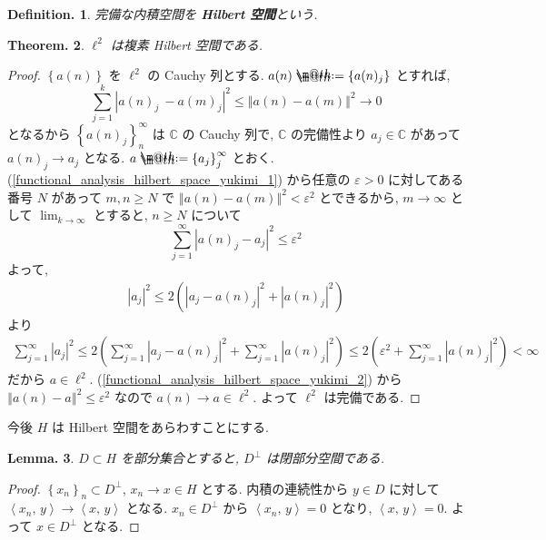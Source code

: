 \documentclass[openany, a4paper, oneside]{jsbook}
\makeatletter
\newcommand*{\defeq}{\mathrel{\rlap{%
\raisebox{0.3ex}{$\m@th\cdot$}}%
\raisebox{-0.3ex}{$\m@th\cdot$}}%
=}
\theoremstyle{break}
\newtheorem{thm}{Theorem.}[section]
\newtheorem{lem}[thm]{Lemma.}
\theoremstyle{breakdefn}
\newtheorem{defn}[thm]{Definition.}
\newcommand{\abs}[1]{\left|#1\right|}
\newcommand{\norm}[1]{\left\Vert#1\right\Vert}
\newcommand{\rbk}[1]{\left (#1\right)}
\newcommand{\cbk}[1]{\left\{#1\right\}}
\newcommand{\bkt}[2]{\left\langle#1,\,#2\right\rangle}
\newcommand{\bbC}{\mathbb{C}}
\newcommand{\upbf}[1]{\textup{\textbf{#1}}}
\makeatother
\begin{document}
\begin{defn}
 完備な内積空間を \upbf{Hilbert 空間}という.
\end{defn}
\begin{thm}
 $\ell^2$ は複素 Hilbert 空間である.
\end{thm}
\begin{proof}
$\cbk{a (n)}$ を $\ell^2$ の Cauchy 列とする.
$a(n) \defeq \cbk{a (n)_{j}}$ とすれば,
\begin{equation}
 \sum_{j=1}^k \abs{a (n)_{j}\ - a (m)_{j}}^2
 \leq
 \norm{a (n) - a (m)}^2
 \longrightarrow 0 \label{functional_analysis_hilbert_space_yukimi_1}
\end{equation}
となるから $\cbk{a (n)_{j}}_{n}^\infty$ は $\bbC$ の Cauchy 列で,
$\bbC$ の完備性より $a_{j} \in \bbC$ があって $a (n)_{j} \longrightarrow a_{j}$ となる.
$a \defeq \cbk{a_{j}}_{j}^\infty$ とおく.
(\ref{functional_analysis_hilbert_space_yukimi_1}) から任意の $\varepsilon > 0$ に対してある番号 $N$ があって
$m, n \geq N$ で $\norm{a (n) - a (m)}^2 < \varepsilon^2$ とできるから,
$m \longrightarrow \infty$ として $\lim_{k \to \infty}$ とすると, $n \geq N$ について
\begin{equation}
 \sum_{j=1}^\infty \abs{a (n)_{j} - a_{j}}^2
 \leq
 \varepsilon^2 \label{functional_analysis_hilbert_space_yukimi_2}
\end{equation}
よって,
\begin{align}
 \abs{a_{j}}^2
 \leq
 2 \rbk{\abs{a_j - a(n)_j}^2 + \abs{a(n)_{j}}^2}
\end{align}
より
\begin{align}
 \sum_{j=1}^\infty \abs{a_{j}}^2
 \leq
 2 \rbk{\sum_{j=1}^\infty \abs{a_{j} -a (n)_{j}}^2 + \sum_{j=1}^\infty \abs{a (n)_{j}}^2}
 \leq
 2 \rbk{\varepsilon^2 + \sum_{j=1}^\infty \abs{a (n)_{j}}^2}
 <
 \infty
\end{align}
だから $a \in \ell^2$.
(\ref{functional_analysis_hilbert_space_yukimi_2}) から
$\norm{a(n) - a}^2 \leq \varepsilon^2$
なので $a(n) \longrightarrow a \in \ell^2$.
よって $\ell^2$ は完備である.
\end{proof}

今後 $H$ は Hilbert 空間をあらわすことにする.
\begin{lem}\label{functional_analysis_hilbert_space_yukimi_5}
 $D \subset H$ を部分集合とすると, $D^{\perp}$ は閉部分空間である.
\end{lem}
\begin{proof}
$\cbk{x_n}_n \subset D^{\perp}$, $x_n \to x \in H$ とする.
内積の連続性から $y \in D$ に対して $\bkt{x_n}{y} \to \bkt{x}{y}$ となる.
$x_{n} \in D^{\perp}$ から $\bkt{x_n}{y} = 0$ となり, $\bkt{x}{y} = 0$.
よって $x \in D^{\perp}$ となる.
\end{proof}
\end{document}
